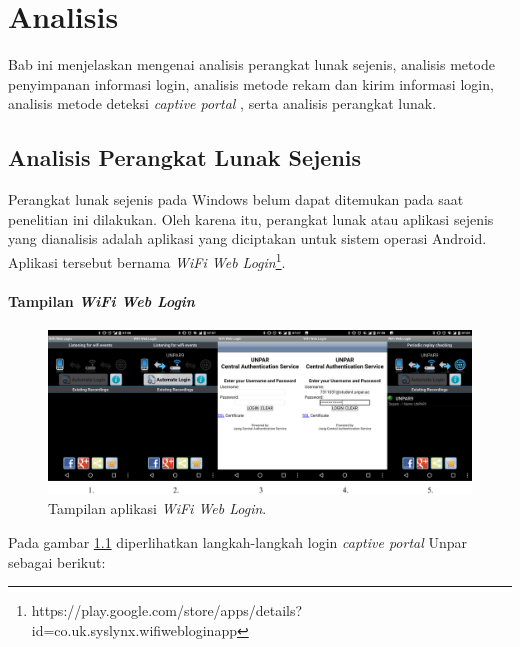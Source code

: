 \chapter{Analisis}
\label{chap:analisis}

Bab ini menjelaskan mengenai analisis perangkat lunak sejenis, analisis metode penyimpanan informasi login, analisis metode rekam dan kirim informasi login, analisis metode deteksi \textit{captive portal} , serta analisis perangkat lunak.



\section{Analisis Perangkat Lunak Sejenis}
\label{sec:perangkat_lunak_sejenis}

Perangkat lunak sejenis pada Windows belum dapat ditemukan pada saat penelitian ini dilakukan. Oleh karena itu, perangkat lunak atau aplikasi sejenis yang dianalisis adalah aplikasi yang diciptakan untuk sistem operasi Android. Aplikasi tersebut bernama \textit{WiFi Web Login}\footnote{https://play.google.com/store/apps/details?id=co.uk.syslynx.wifiwebloginapp}.

\subsubsection{Tampilan \textit{WiFi Web Login}}
\label{subsubsec:tampilan_wifi_web_login}

\begin{figure}[h]
    \centering
    \includegraphics[scale=0.085]{Gambar/screenshot_wifiweblogin.png}
    \caption[Tampilan aplikasi \textit{WiFi Web Login}.]{Tampilan aplikasi \textit{WiFi Web Login}.} 
    \label{fig:screenshot_wifiweblogin}
\end{figure}

Pada gambar \ref{fig:screenshot_wifiweblogin} diperlihatkan langkah-langkah login \textit{captive portal} Unpar sebagai berikut:

